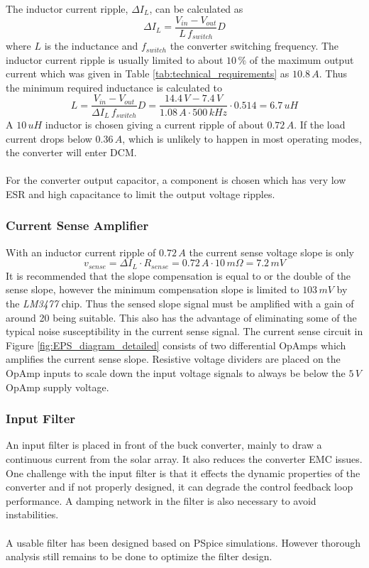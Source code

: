 \noindent
The inductor current ripple, $\Delta I_L$, can be calculated as 
%
\begin{equation}
\Delta I_L=\dfrac{V_{in}-V_{out}}{L\,f_{switch}}D
\end{equation}
%
where $L$ is the inductance and $f_{switch}$ the converter switching frequency. The inductor current ripple is usually limited to about $10\,\%$ of the maximum output current which was given in Table \ref{tab:technical_requirements} as $10.8\,A$. Thus the minimum required inductance is calculated to
%
\begin{equation}
L=\dfrac{V_{in}-V_{out}}{\Delta I_L\,f_{switch}}D=\dfrac{14.4\,V-7.4\,V}{1.08\,A\cdot 500\,kHz}\cdot 0.514=6.7\,uH
\end{equation}
%
A $10\,uH$ inductor is chosen giving a current ripple of about $0.72\,A$. If the load current drops below $0.36\,A$, which is unlikely to happen in most operating modes, the converter will enter \ac{DCM}.
\\
\\
For the converter output capacitor, a component is chosen which has very low \ac{ESR} and high capacitance to limit the output voltage ripples.
%
\subsubsection*{Current Sense Amplifier}
With an inductor current ripple of $0.72\,A$ the current sense voltage slope is only 
%
\begin{equation}
v_{sense}=\Delta I_L\cdot R_{sense}=0.72\,A\cdot 10\,m\Omega = 7.2\,mV
\end{equation}
%
It is recommended that the slope compensation is equal to or the double of the sense slope\cite[sec. 12-1]{Fundamentals}, however the minimum compensation slope is limited to $103\,mV$ by the \textit{LM3477} chip. Thus the sensed slope signal must be amplified with a gain of around 20 being suitable. This also has the advantage of eliminating some of the typical noise susceptibility in the current sense signal. The current sense circuit in Figure \ref{fig:EPS_diagram_detailed} consists of two differential OpAmps which amplifies the current sense slope. Resistive voltage dividers are placed on the OpAmp inputs to scale down the input voltage signals to always be below the $5\,V$ OpAmp supply voltage.
%
\subsubsection*{Input Filter}
An input filter is placed in front of the buck converter, mainly to draw a continuous current from the solar array. It also reduces the converter \ac{EMC} issues. 
One challenge with the input filter is that it effects the dynamic properties of the converter and if not properly designed, it can degrade the control feedback loop performance. A damping network in the filter is also necessary to avoid instabilities\cite[sec. 10-3]{Fundamentals}.
\\
\\
A usable filter has been designed based on PSpice simulations. However thorough analysis still remains to be done to optimize the filter design.
%
%
